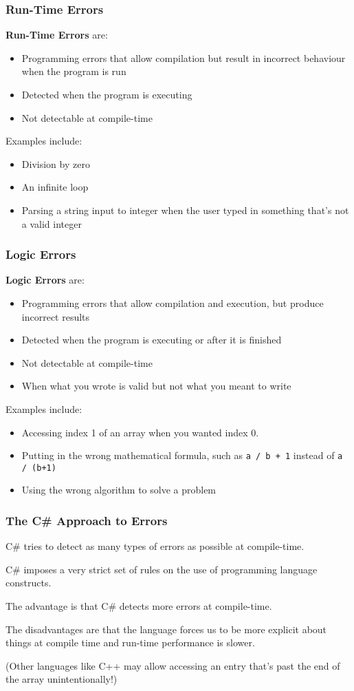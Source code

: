 \begin{frame}
\frametitle{Run-Time Errors}
\textbf{Run-Time Errors} are:
\begin{itemize}
	\item Programming errors that allow compilation but result in incorrect behaviour when the program is run
	\item Detected when the program is executing
	\item Not detectable at compile-time
\end{itemize}

Examples include:
		\begin{itemize}
			\item Division by zero
			\item An infinite loop
			\item Parsing a string input to integer when the user typed in something that's not a valid integer
		\end{itemize}

\end{frame}

\begin{frame}
\frametitle{Logic Errors}
\textbf{Logic Errors} are:
\begin{itemize}
	\item Programming errors that allow compilation and execution, but produce incorrect results
	\item Detected when the program is executing or after it is finished
	\item Not detectable at compile-time
	\item When what you wrote is valid but not what you meant to write
\end{itemize}

Examples include:
		\begin{itemize}
			\item Accessing index 1 of an array when you wanted index 0.
			\item Putting in the wrong mathematical formula, such as \texttt{a / b + 1} instead of \texttt{a / (b+1)}
			\item Using the wrong algorithm to solve a problem
		\end{itemize}

\end{frame}

\begin{frame}
\frametitle{The C\# Approach to Errors}
C\# tries to detect as many types of errors as possible at compile-time.

C\# imposes a very strict set of rules on the use of programming language constructs.


The advantage is that C\# detects more errors at compile-time.

The disadvantages are that the language forces us to be more explicit about things at compile time and run-time performance is slower.

(Other languages like C++ may allow accessing an entry that's past the end of the array unintentionally!)

\end{frame}


